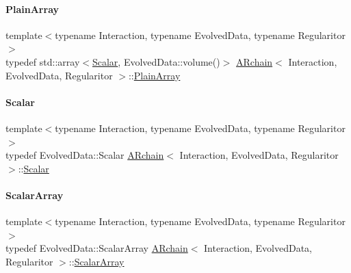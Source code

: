 \mbox{\label{class_a_rchain_a829aca51411c08ffd518294770a374d5}} 
\paragraph{\texorpdfstring{Plain\+Array}{PlainArray}}
{\footnotesize\ttfamily template$<$typename Interaction, typename Evolved\+Data, typename Regularitor$>$ \\
typedef std\+::array$<$\mbox{\hyperlink{class_a_rchain_a707e42a79e4744424a34c9007e84ee07}{Scalar}}, Evolved\+Data\+::volume()$>$ \mbox{\hyperlink{class_a_rchain}{A\+Rchain}}$<$ Interaction, Evolved\+Data, Regularitor $>$\+::\mbox{\hyperlink{class_a_rchain_a829aca51411c08ffd518294770a374d5}{Plain\+Array}}}

\mbox{\label{class_a_rchain_a707e42a79e4744424a34c9007e84ee07}} 
\paragraph{\texorpdfstring{Scalar}{Scalar}}
{\footnotesize\ttfamily template$<$typename Interaction, typename Evolved\+Data, typename Regularitor$>$ \\
typedef Evolved\+Data\+::\+Scalar \mbox{\hyperlink{class_a_rchain}{A\+Rchain}}$<$ Interaction, Evolved\+Data, Regularitor $>$\+::\mbox{\hyperlink{class_a_rchain_a707e42a79e4744424a34c9007e84ee07}{Scalar}}}

\mbox{\label{class_a_rchain_a206c7f2ff7ce15041a20d327d28b7be3}} 
\paragraph{\texorpdfstring{Scalar\+Array}{ScalarArray}}
{\footnotesize\ttfamily template$<$typename Interaction, typename Evolved\+Data, typename Regularitor$>$ \\
typedef Evolved\+Data\+::\+Scalar\+Array \mbox{\hyperlink{class_a_rchain}{A\+Rchain}}$<$ Interaction, Evolved\+Data, Regularitor $>$\+::\mbox{\hyperlink{class_a_rchain_a206c7f2ff7ce15041a20d327d28b7be3}{Scalar\+Array}}}

